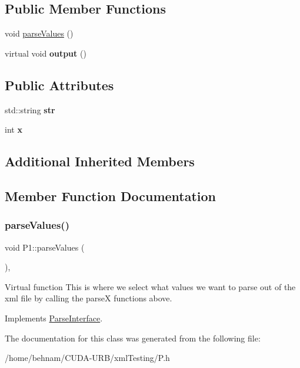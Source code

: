 \subsection*{Public Member Functions}
\begin{DoxyCompactItemize}
\item 
void \hyperlink{classP1_aea4d99ff4e45862292d2dbb83ec32363}{parse\+Values} ()
\item 
\mbox{\label{classP1_a49ad189d8949a0bca3097947830cd984}} 
virtual void {\bfseries output} ()
\end{DoxyCompactItemize}
\subsection*{Public Attributes}
\begin{DoxyCompactItemize}
\item 
\mbox{\label{classP1_a45b090af4331715d98a38a1a2cb4ba05}} 
std\+::string {\bfseries str}
\item 
\mbox{\label{classP1_ab9a666a647699c37220d47c275e2474e}} 
int {\bfseries x}
\end{DoxyCompactItemize}
\subsection*{Additional Inherited Members}


\subsection{Member Function Documentation}
\mbox{\label{classP1_aea4d99ff4e45862292d2dbb83ec32363}} 
\subsubsection{\texorpdfstring{parse\+Values()}{parseValues()}}
{\footnotesize\ttfamily void P1\+::parse\+Values (\begin{DoxyParamCaption}{ }\end{DoxyParamCaption})\hspace{0.3cm}{\ttfamily [inline]}, {\ttfamily [virtual]}}

Virtual function This is where we select what values we want to parse out of the xml file by calling the parseX functions above. 

Implements \hyperlink{classParseInterface_afca32108192ba0997c9e5a78189b0cbc}{Parse\+Interface}.



The documentation for this class was generated from the following file\+:\begin{DoxyCompactItemize}
\item 
/home/behnam/\+C\+U\+D\+A-\/\+U\+R\+B/xml\+Testing/P.\+h\end{DoxyCompactItemize}
